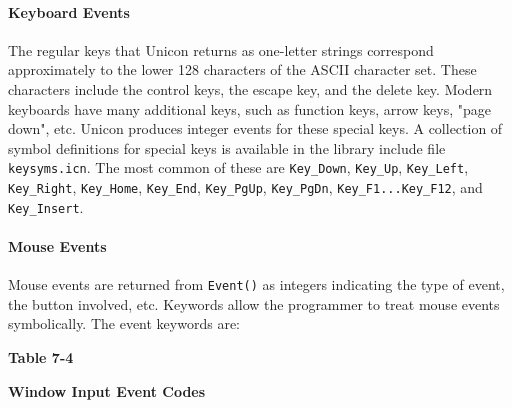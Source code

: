 \paragraph{Keyboard Events}
The regular keys that Unicon returns as one-letter strings correspond
approximately to the lower 128 characters of the ASCII character set.
These characters include the control keys, the escape key, and the
delete key. Modern keyboards have many additional keys, such as
function keys, arrow keys, "page down", etc. Unicon produces integer
events for these special keys. A collection of symbol definitions for
special keys is available in the library include file
\texttt{keysyms.icn}. The most common of these are \texttt{Key\_Down},
\texttt{Key\_Up}, \texttt{Key\_Left}, \texttt{Key\_Right},
\texttt{Key\_Home}, \texttt{Key\_End}, \texttt{Key\_PgUp},
\texttt{Key\_PgDn}, \texttt{Key\_F1...Key\_F12}, and
\texttt{Key\_Insert}.

\paragraph{Mouse Events}
Mouse events are returned from \texttt{Event()} as integers indicating
the type of event, the button involved, etc. Keywords allow the
programmer to treat mouse events symbolically. The event keywords are:

{\centering\sffamily\bfseries
Table 7-4
\par}

{\centering\sffamily\bfseries
Window Input Event Codes
\par}

